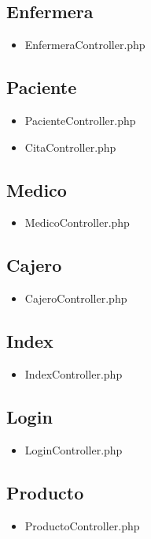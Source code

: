 	\subsection{Enfermera}
	\begin{itemize}
		\item EnfermeraController.php
	\end{itemize}
	\subsection{Paciente}
	\begin{itemize}
		\item PacienteController.php
		\item CitaController.php
	\end{itemize}
	\subsection{Medico}
	\begin{itemize}
		\item MedicoController.php
	\end{itemize}
	\subsection{Cajero}
	\begin{itemize}
		\item CajeroController.php
	\end{itemize}
	\subsection{Index}
	\begin{itemize}
		\item IndexController.php
	\end{itemize}
	\subsection{Login}
	\begin{itemize}
		\item LoginController.php
	\end{itemize}
	\subsection{Producto}
	\begin{itemize}
		\item ProductoController.php
	\end{itemize}
	
